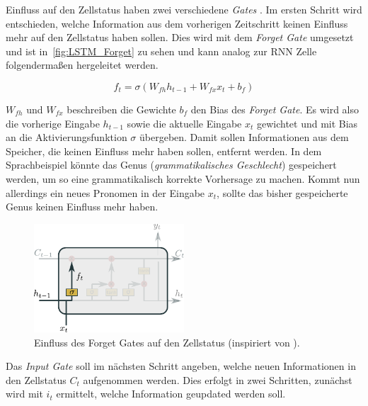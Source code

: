                 Einfluss auf den Zellstatus haben zwei verschiedene \textit{Gates} .
            Im ersten Schritt wird entschieden, welche Information aus dem vorherigen Zeitschritt keinen Einfluss mehr auf den Zellstatus haben sollen.
            Dies wird mit dem \textit{Forget Gate} umgesetzt und ist in~\autoref{fig:LSTM_Forget} zu sehen und kann analog zur RNN Zelle folgendermaßen hergeleitet werden.

            \begin{equation}
                f_t = \sigma\left(W_{fh}h_{t-1} + W_{fx}x_t + b_f\right)
            \end{equation}

            $W_{fh}$ und $W_{fx}$ beschreiben die Gewichte $b_f$ den Bias des \textit{Forget Gate}.
            Es wird also die vorherige Eingabe $h_{t-1}$ sowie die aktuelle Eingabe $x_t$ gewichtet und mit Bias an die Aktivierungsfunktion $\sigma$ übergeben.
            Damit sollen Informationen aus dem Speicher, die keinen Einfluss mehr haben sollen, entfernt werden.
            In dem Sprachbeispiel könnte das Genus (\textit{grammatikalisches Geschlecht}) gespeichert werden, um so eine grammatikalisch korrekte Vorhersage zu machen.
            Kommt nun allerdings ein neues Pronomen in der Eingabe $x_t$, sollte das bisher gespeicherte Genus keinen Einfluss mehr haben.
            
                \begin{figure}[ht]
                    \centering
                    \includegraphics[width=0.5\textwidth]{images/Illustrationen/LSTM_FG}
                    \caption{Einfluss des Forget Gates auf den Zellstatus (inspiriert von \cite{OLAH2015}).}
                    \label{fig:LSTM_Forget}
                \end{figure}
                
            Das \textit{Input Gate} soll im nächsten Schritt angeben, welche neuen Informationen in den Zellstatus $C_t$ aufgenommen werden.
            Dies erfolgt in zwei Schritten, zunächst wird mit $i_t$ ermittelt, welche Information geupdated werden soll.

